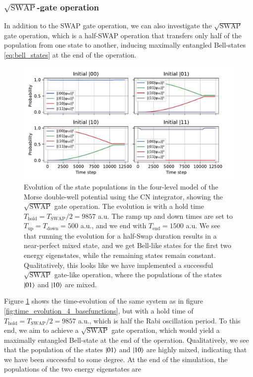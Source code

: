 \documentclass{subfiles}
\begin{document}
\subsubsection*{$\sqrt{\text{SWAP}}$-gate operation}
In addition to the SWAP gate operation, we can also investigate the $\sqrt{\text{SWAP}}$ gate operation, which is a half-SWAP operation that transfers only half of the population from one state to another, inducing maximally entangled Bell-states \eqref{eq:bell_states} at the end of the operation. 
\begin{figure}[h!]
    \centering
    \includegraphics[width=1.0\textwidth]{figs/time_evolution_4_basefunctions_2306_squareSWAP.pdf}
    \caption{Evolution of the state populations in the four-level model of the Morse double-well potential using the CN integrator, showing the $\sqrt{\text{SWAP}}$ gate operation. The evolution is with a hold time $T_{\text{hold}} = T_{\text{SWAP}}/2 = 9857$ a.u. The ramp up and down times are set to $T_{\text{up}} = T_{\text{down}} = 500$ a.u., and we end with $T_{\text{end}} = 1500$ a.u. We see that running the evolution for a half-Swap duration results in a near-perfect mixed state, and we get Bell-like states for the first two energy eigenstates, while the remaining states remain constant. Qualitatively, this looks like we have implemented a successful $\sqrt{\text{SWAP}}$ gate-like operation, where the populations of the states $\ket{01}$ and $\ket{10}$ are mixed.}
    \label{fig:time_evolution_4_basefunctions_sqrtSWAP}
\end{figure}
Figure \ref{fig:time_evolution_4_basefunctions_sqrtSWAP} shows the time-evolution of the same system as in figure \ref{fig:time_evolution_4_basefunctions}, but with a hold time of $T_{\text{hold}} = T_{\text{SWAP}}/2 = 9857$ a.u., which is half the Rabi oscillation period. To this end, we aim to achieve a $\sqrt{\text{SWAP}}$ gate operation, which would yield a maximally entangled Bell-state at the end of the operation. Qualitatively, we see that the population of the states $\ket{01}$ and $\ket{10}$ are highly mixed, indicating that we have been successful to some degree. At the end of the simulation, the populations of the two energy eigenstates are
\end{document}
